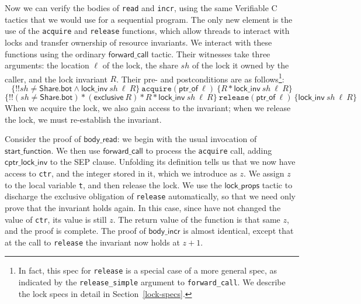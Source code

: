 \documentclass[11pt]{article}
\begin{document}
Now we can verify the bodies of \texttt{read} and \texttt{incr}, using the same Verifiable C tactics that we would use for a sequential program. The only new element is the use of the \texttt{acquire} and \texttt{release} functions, which allow threads to interact with locks and transfer ownership of resource invariants. We interact with these functions using the ordinary $\mathsf{forward\_call}$ tactic. Their witnesses take three arguments: the location $\ell$ of the lock, the share $\mathit{sh}$ of the lock it owned by the caller, and the lock invariant $R$. Their pre- and postconditions are as follows\footnote{In fact, this spec for \texttt{release} is a special case of a more general spec, as indicated by the \texttt{release\_simple} argument to \texttt{forward\_call}. We describe the lock specs in detail in Section~\ref{lock-specs}.}:
$$\{!!\mathit{sh} \neq \mathsf{Share.bot} \land \mathsf{lock\_inv}\ \mathit{sh}\ \ell\ R\}\ \texttt{acquire}(\mathsf{ptr\_of}\ \ell)\ \{R * \mathsf{lock\_inv}\ \mathit{sh}\ \ell\ R\}$$
$$\{!!(\mathit{sh} \neq \mathsf{Share.bot}) * (\mathsf{exclusive}\ R) * R * \mathsf{lock\_inv}\ \mathit{sh}\ \ell\ R\}\ \texttt{release}(\mathsf{ptr\_of}\ \ell)\ \{\mathsf{lock\_inv}\ \mathit{sh}\ \ell\ R\}$$
When we acquire the lock, we also gain access to the invariant; when we release the lock, we must re-establish the invariant.

Consider the proof of $\mathsf{body\_read}$: we begin with the usual invocation of $\mathsf{start\_function}$. We then use $\mathsf{forward\_call}$ to process the \texttt{acquire} call, adding $\mathsf{cptr\_lock\_inv}$ to the \textsf{SEP} clause. Unfolding its definition tells us that we now have access to \texttt{ctr}, and the integer stored in it, which we introduce as $z$. We assign $z$ to the local variable \texttt{t}, and then release the lock. We use the $\mathsf{lock\_props}$ tactic to discharge the exclusive obligation of \texttt{release} automatically, so that we need only prove that the invariant holds again. In this case, since have not changed the value of \texttt{ctr}, its value is still $z$. The return value of the function is that same $z$, and the proof is complete. The proof of $\mathsf{body\_incr}$ is almost identical, except that at the call to \texttt{release} the invariant now holds at $z + 1$.
\end{document}
